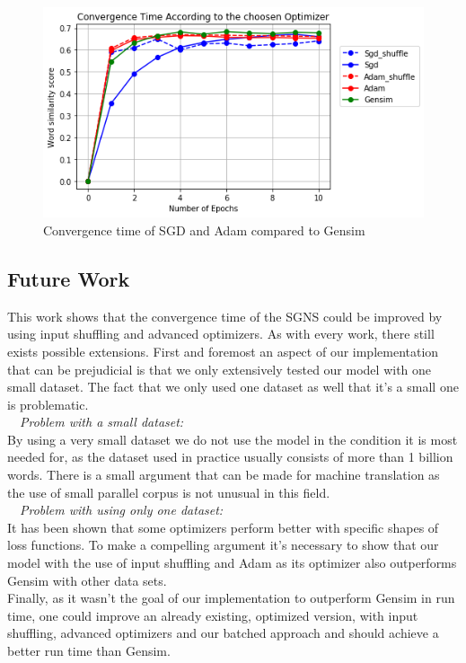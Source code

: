 \begin{figure}[h]
\centering
\includegraphics[scale=0.45]{images/comparison}
\caption{Convergence time of SGD and Adam compared to Gensim}
\label{fig:gensim_vs_adam}
\end{figure}

\subsection{Future Work}
This work shows that the convergence time of the SGNS could be improved by using input shuffling and advanced optimizers. As with every work, there still exists possible extensions. First and foremost an aspect of our implementation that can be prejudicial is that we only extensively tested our model with one small dataset. The fact that we only used one dataset as well that it's a small one is problematic. \\ 
~~\textit{Problem with a small dataset:} \\ By using a very small dataset we do not use the model in the condition it is most needed for, as the dataset used in practice usually consists of more than 1 billion words. There is a small argument that can be made for machine translation as the use of small parallel corpus is not unusual in this field. \\
~~\textit{Problem with using only one dataset:}\\
It has been shown that some optimizers perform better with specific shapes of loss functions. To make a compelling argument it's necessary to show that our model with the use of input shuffling and Adam as its optimizer also outperforms Gensim with other data sets.\\
Finally, as it wasn't the goal of our implementation to outperform Gensim in run time, one could improve an already existing, optimized version, with input shuffling, advanced optimizers  and our batched approach and should achieve a better run time than Gensim.